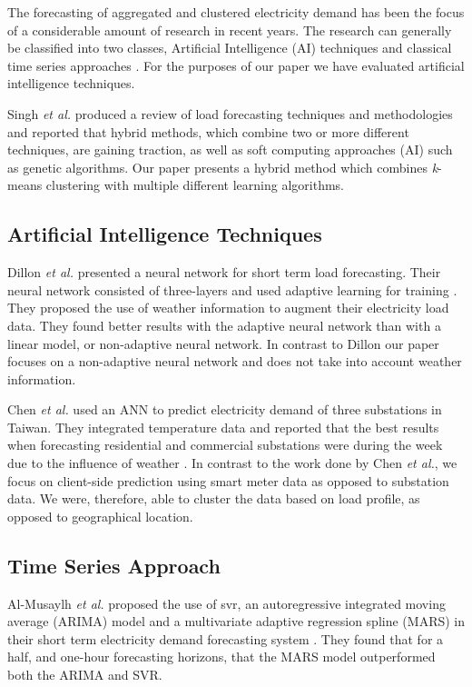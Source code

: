 The forecasting of aggregated and clustered electricity demand has been the focus of a considerable amount of research in recent years. The research can generally be classified into two classes, Artificial Intelligence (AI) techniques \cite{Kim2000, Tiong2008,Quilumba2014} and classical time series approaches \cite{Nazarko2005ARIMAApproach,Huang2003,Nguyen2017}. For the purposes of our paper we have evaluated artificial intelligence techniques.

Singh \textit{et al.} \cite{Singh2012} produced a review of load forecasting techniques and methodologies and reported that hybrid methods, which combine two or more different techniques, are gaining traction, as well as soft computing approaches (AI) such as genetic algorithms. Our paper presents a hybrid method which combines \textit{k}-means clustering with multiple different learning algorithms.

\subsection{Artificial Intelligence Techniques}

Dillon \textit{et al.} presented a neural network for short term load forecasting. Their neural network consisted of three-layers and used adaptive learning for training \cite{Dillon1991}. They proposed the use of weather information to augment their electricity load data. They found better results with the adaptive neural network than with a linear model, or non-adaptive neural network. In contrast to Dillon our paper focuses on a non-adaptive neural network and does not take into account weather information.

Chen \textit{et al.} used an \Gls{ANN} to predict electricity demand of three substations in Taiwan. They integrated temperature data and reported that the best results when forecasting residential and commercial substations were during the week due to the influence of weather \cite{Chen1996}. In contrast to the work done by Chen \textit{et al.}, we focus on client-side prediction using smart meter data as opposed to substation data. We were, therefore, able to cluster the data based on load profile, as opposed to geographical location.


\subsection{Time Series Approach}

Al-Musaylh \textit{et al.} proposed the use of \acrshort{svr}, an autoregressive integrated moving average (ARIMA) model and a multivariate adaptive regression spline (MARS) in their short term electricity demand forecasting system \cite{Al-Musaylh2018}. They found that for a half, and one-hour forecasting horizons, that the MARS model outperformed both the ARIMA and SVR.

